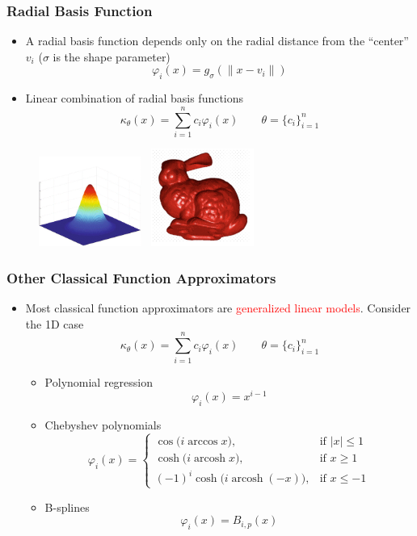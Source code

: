 \documentclass{beamer}
\newcommand{\red}[1]{\textcolor{red}{#1}}
\begin{document}
\begin{frame}
\frametitle{Radial Basis Function}
\begin{itemize}
	\item A radial basis function depends only on the radial distance from the ``center'' $v_i$ ($\sigma$ is the shape parameter)
	$$\varphi_i(x) = g_{\sigma}(\|x-v_i\|)$$
	\item Linear combination of radial basis functions
	\begin{equation*}
		\kappa_{\theta}(x) = \sum_{i=1}^n c_i\varphi_i(x)\qquad \theta = \{c_i\}_{i=1}^n
	\end{equation*}
\end{itemize}
\begin{figure}[hbt]
  \includegraphics[width=0.3\textwidth]{figures/rbf}~
  \includegraphics[width=0.3\textwidth]{figures/rbfapp}
\end{figure}

\end{frame}


\begin{frame}
\frametitle{Other Classical Function Approximators}

\begin{itemize}
	\item Most classical function approximators are \red{generalized linear models}. Consider the 1D case
	\begin{equation*}
		\kappa_{\theta}(x) = \sum_{i=1}^n c_i\varphi_i(x)\qquad \theta = \{c_i\}_{i=1}^n
	\end{equation*}
	
	\begin{itemize}
	\item Polynomial regression 
	$$\varphi_i(x) = x^{i-1} $$
	\item Chebyshev polynomials
	$$\varphi_i(x) = \begin{cases}
\cos\big(i \arccos x \big), & \text{if }|x| \le 1 \\
\cosh\big(i \operatorname{arcosh} x \big), & \text{if }x \ge 1 \\ 
(-1)^i \cosh\big(i \operatorname{arcosh} (-x) \big), & \text{if }x \le -1  
\end{cases}$$
\item B-splines
$$\varphi_i(x) = B_{i,p}(x)$$
	\end{itemize}
\end{itemize}
\end{frame}
\end{document}
